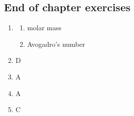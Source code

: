 \subsection{End of chapter exercises}
\begin{multicols}{4}
 \begin{enumerate}[noitemsep, label=\textbf{(\arabic*)} ]
  \item 
\begin{enumerate}[noitemsep, label=\textbf{(\alph*)} ]
 \item molar mass
\item Avogadro's number
\end{enumerate}

 \item D
\item A
\item A
\item C


\end{enumerate}
\end{multicols}
